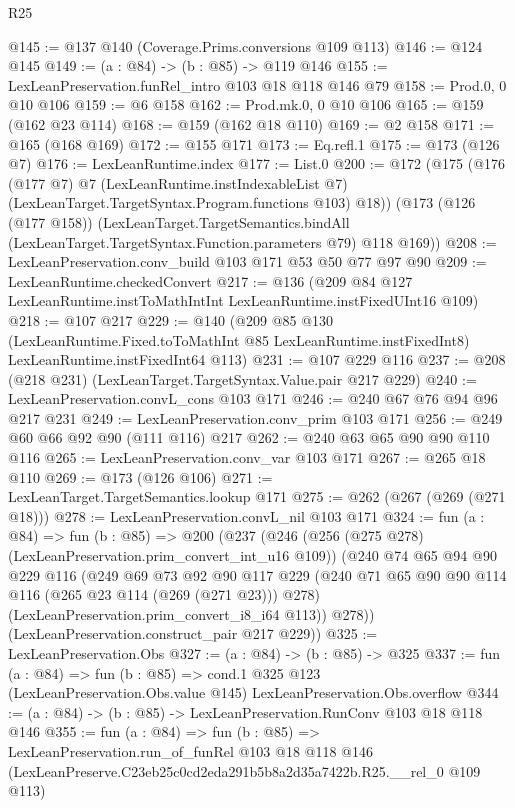 \begin{lexlean}{R25}
\begin{coremodule}
@145 := @137 @140 (Coverage.Prims.conversions @109 @113)
@146 := @124 @145
@149 := (a : @84) -> (b : @85) -> @119 @146
@155 := LexLeanPreservation.funRel_intro @103 @18 @118 @146 @79
@158 := Prod.{0, 0} @10 @106
@159 := @6 @158
@162 := Prod.mk.{0, 0} @10 @106
@165 := @159 (@162 @23 @114)
@168 := @159 (@162 @18 @110)
@169 := @2 @158
@171 := @165 (@168 @169)
@172 := @155 @171
@173 := Eq.refl.{1}
@175 := @173 (@126 @7)
@176 := LexLeanRuntime.index
@177 := List.{0}
@200 := @172
    (@175
      (@176
        (@177 @7)
        @7
        (LexLeanRuntime.instIndexableList @7)
        (LexLeanTarget.TargetSyntax.Program.functions @103)
        @18))
    (@173
      (@126 (@177 @158))
      (LexLeanTarget.TargetSemantics.bindAll
        (LexLeanTarget.TargetSyntax.Function.parameters @79)
        @118
        @169))
@208 := LexLeanPreservation.conv_build @103 @171 @53 @50 @77 @97 @90
@209 := LexLeanRuntime.checkedConvert
@217 := @136 (@209 @84 @127 LexLeanRuntime.instToMathIntInt LexLeanRuntime.instFixedUInt16 @109)
@218 := @107 @217
@229 := @140
    (@209
      @85
      @130
      (LexLeanRuntime.Fixed.toToMathInt @85 LexLeanRuntime.instFixedInt8)
      LexLeanRuntime.instFixedInt64
      @113)
@231 := @107 @229 @116
@237 := @208 (@218 @231) (LexLeanTarget.TargetSyntax.Value.pair @217 @229)
@240 := LexLeanPreservation.convL_cons @103 @171
@246 := @240 @67 @76 @94 @96 @217 @231
@249 := LexLeanPreservation.conv_prim @103 @171
@256 := @249 @60 @66 @92 @90 (@111 @116) @217
@262 := @240 @63 @65 @90 @90 @110 @116
@265 := LexLeanPreservation.conv_var @103 @171
@267 := @265 @18 @110
@269 := @173 (@126 @106)
@271 := LexLeanTarget.TargetSemantics.lookup @171
@275 := @262 (@267 (@269 (@271 @18)))
@278 := LexLeanPreservation.convL_nil @103 @171
@324 := fun (a : @84) =>
  fun (b : @85) =>
  @200
    (@237
      (@246
        (@256 (@275 @278) (LexLeanPreservation.prim_convert_int_u16 @109))
        (@240
          @74
          @65
          @94
          @90
          @229
          @116
          (@249
            @69
            @73
            @92
            @90
            @117
            @229
            (@240 @71 @65 @90 @90 @114 @116 (@265 @23 @114 (@269 (@271 @23))) @278)
            (LexLeanPreservation.prim_convert_i8_i64 @113))
          @278))
      (LexLeanPreservation.construct_pair @217 @229))
@325 := LexLeanPreservation.Obs
@327 := (a : @84) -> (b : @85) -> @325
@337 := fun (a : @84) =>
  fun (b : @85) =>
  cond.{1} @325 @123 (LexLeanPreservation.Obs.value @145) LexLeanPreservation.Obs.overflow
@344 := (a : @84) -> (b : @85) -> LexLeanPreservation.RunConv @103 @18 @118 @146
@355 := fun (a : @84) =>
  fun (b : @85) =>
  LexLeanPreservation.run_of_funRel
    @103
    @18
    @118
    @146
    (LexLeanPreserve.C23eb25c0cd2eda291b5b8a2d35a7422b.R25.__rel_0 @109 @113)
\end{coremodule}
\end{lexlean}
